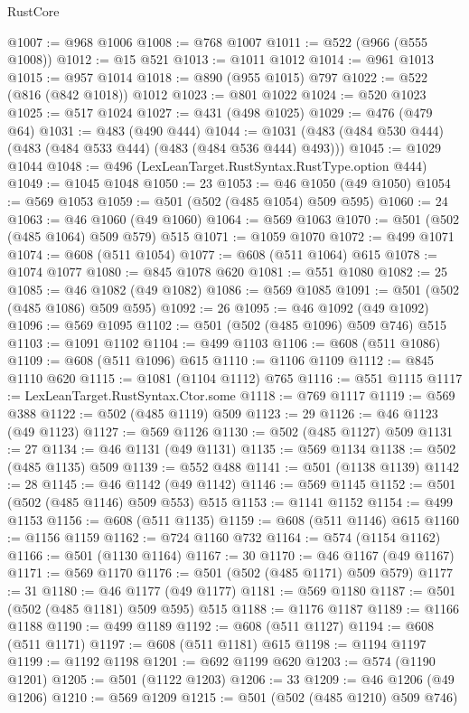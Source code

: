 \begin{lexlean}{RustCore}
\begin{coremodule}
@1007 := @968 @1006
@1008 := @768 @1007
@1011 := @522 (@966 (@555 @1008))
@1012 := @15 @521
@1013 := @1011 @1012
@1014 := @961 @1013
@1015 := @957 @1014
@1018 := @890 (@955 @1015) @797
@1022 := @522 (@816 (@842 @1018)) @1012
@1023 := @801 @1022
@1024 := @520 @1023
@1025 := @517 @1024
@1027 := @431 (@498 @1025)
@1029 := @476 (@479 @64)
@1031 := @483 (@490 @444)
@1044 := @1031 (@483 (@484 @530 @444) (@483 (@484 @533 @444) (@483 (@484 @536 @444) @493)))
@1045 := @1029 @1044
@1048 := @496 (LexLeanTarget.RustSyntax.RustType.option @444)
@1049 := @1045 @1048
@1050 := 23
@1053 := @46 @1050 (@49 @1050)
@1054 := @569 @1053
@1059 := @501 (@502 (@485 @1054) @509 @595)
@1060 := 24
@1063 := @46 @1060 (@49 @1060)
@1064 := @569 @1063
@1070 := @501 (@502 (@485 @1064) @509 @579) @515
@1071 := @1059 @1070
@1072 := @499 @1071
@1074 := @608 (@511 @1054)
@1077 := @608 (@511 @1064) @615
@1078 := @1074 @1077
@1080 := @845 @1078 @620
@1081 := @551 @1080
@1082 := 25
@1085 := @46 @1082 (@49 @1082)
@1086 := @569 @1085
@1091 := @501 (@502 (@485 @1086) @509 @595)
@1092 := 26
@1095 := @46 @1092 (@49 @1092)
@1096 := @569 @1095
@1102 := @501 (@502 (@485 @1096) @509 @746) @515
@1103 := @1091 @1102
@1104 := @499 @1103
@1106 := @608 (@511 @1086)
@1109 := @608 (@511 @1096) @615
@1110 := @1106 @1109
@1112 := @845 @1110 @620
@1115 := @1081 (@1104 @1112) @765
@1116 := @551 @1115
@1117 := LexLeanTarget.RustSyntax.Ctor.some
@1118 := @769 @1117
@1119 := @569 @388
@1122 := @502 (@485 @1119) @509
@1123 := 29
@1126 := @46 @1123 (@49 @1123)
@1127 := @569 @1126
@1130 := @502 (@485 @1127) @509
@1131 := 27
@1134 := @46 @1131 (@49 @1131)
@1135 := @569 @1134
@1138 := @502 (@485 @1135) @509
@1139 := @552 @488
@1141 := @501 (@1138 @1139)
@1142 := 28
@1145 := @46 @1142 (@49 @1142)
@1146 := @569 @1145
@1152 := @501 (@502 (@485 @1146) @509 @553) @515
@1153 := @1141 @1152
@1154 := @499 @1153
@1156 := @608 (@511 @1135)
@1159 := @608 (@511 @1146) @615
@1160 := @1156 @1159
@1162 := @724 @1160 @732
@1164 := @574 (@1154 @1162)
@1166 := @501 (@1130 @1164)
@1167 := 30
@1170 := @46 @1167 (@49 @1167)
@1171 := @569 @1170
@1176 := @501 (@502 (@485 @1171) @509 @579)
@1177 := 31
@1180 := @46 @1177 (@49 @1177)
@1181 := @569 @1180
@1187 := @501 (@502 (@485 @1181) @509 @595) @515
@1188 := @1176 @1187
@1189 := @1166 @1188
@1190 := @499 @1189
@1192 := @608 (@511 @1127)
@1194 := @608 (@511 @1171)
@1197 := @608 (@511 @1181) @615
@1198 := @1194 @1197
@1199 := @1192 @1198
@1201 := @692 @1199 @620
@1203 := @574 (@1190 @1201)
@1205 := @501 (@1122 @1203)
@1206 := 33
@1209 := @46 @1206 (@49 @1206)
@1210 := @569 @1209
@1215 := @501 (@502 (@485 @1210) @509 @746)

\end{coremodule}
\end{lexlean}
